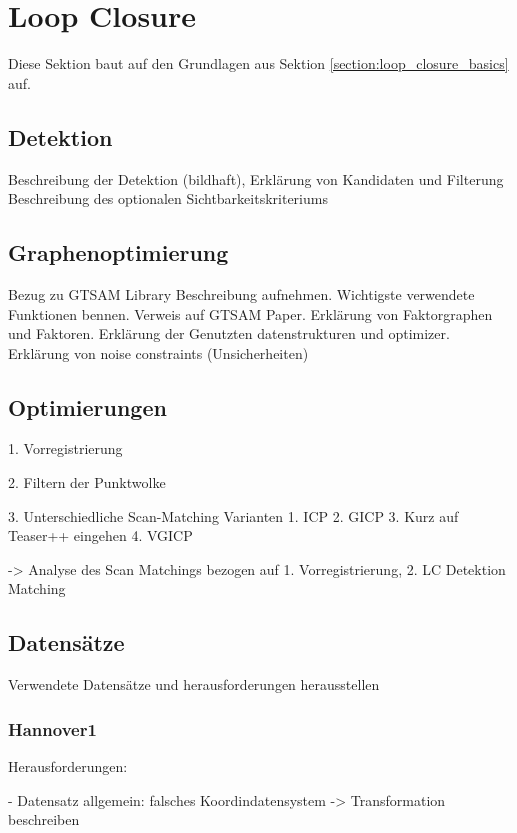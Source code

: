 \chapter{Loop Closure}
\label{chapter:loop_closure}

Diese Sektion baut auf den Grundlagen aus Sektion \ref{section:loop_closure_basics} auf.

\section{Detektion}

Beschreibung der Detektion (bildhaft), Erklärung von Kandidaten und Filterung
Beschreibung des optionalen Sichtbarkeitskriteriums

\section{Graphenoptimierung}

Bezug zu GTSAM Library Beschreibung aufnehmen.
Wichtigste verwendete Funktionen bennen.
Verweis auf GTSAM Paper.
Erklärung von Faktorgraphen und Faktoren.
Erklärung der Genutzten datenstrukturen und optimizer.
Erklärung von noise constraints (Unsicherheiten)

\section{Optimierungen}

1. Vorregistrierung

2. Filtern der Punktwolke

3. Unterschiedliche Scan-Matching Varianten
	1. ICP
	2. GICP
	3. Kurz auf Teaser++ eingehen
	4. VGICP
	
	-> Analyse des Scan Matchings bezogen auf 1. Vorregistrierung, 2. LC Detektion Matching
	
\section{Datensätze}

Verwendete Datensätze und herausforderungen herausstellen

\subsection{Hannover1}

Herausforderungen:

- Datensatz allgemein: falsches Koordindatensystem -> Transformation beschreiben

